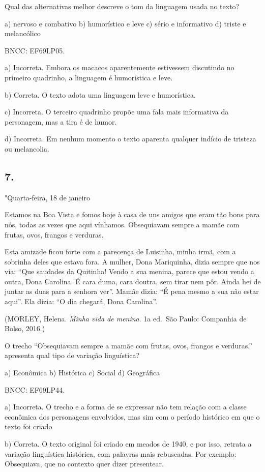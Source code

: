 Qual das alternativas melhor descreve o tom da linguagem usada no texto?

a) nervoso e combativo b) humorístico e leve c) sério e informativo d)
triste e melancólico

BNCC: EF69LP05.

a) Incorreta. Embora os macacos aparentemente estivessem discutindo no
primeiro quadrinho, a linguagem é humorística e leve.

b) Correta. O texto adota uma linguagem leve e humorística.

c) Incorreta. O terceiro quadrinho propõe uma fala mais informativa da
personagem, mas a tira é de humor.

d) Incorreta. Em nenhum momento o texto aparenta qualquer indício de
tristeza ou melancolia.

\hypertarget{section}{%
\subsection{7.}\label{section}}

"Quarta-feira, 18 de janeiro

Estamos na Boa Vista e fomos hoje à casa de uns amigos que eram tão bons
para nós, todas as vezes que aqui vínhamos. Obsequiavam sempre a mamãe
com frutas, ovos, frangos e verduras.

Esta amizade ficou forte com a parecença de Luisinha, minha irmã, com a
sobrinha deles que estava fora. A mulher, Dona Mariquinha, dizia sempre
que nos via: ``Que saudades da Quitinha! Vendo a sua menina, parece que
estou vendo a outra, Dona Carolina. É cara duma, cara doutra, sem tirar
nem pôr. Ainda hei de juntar as duas para a senhora ver''. Mamãe dizia:
``É pena mesmo a sua não estar aqui''. Ela dizia: ``O dia chegará, Dona
Carolina''.

(MORLEY, Helena. \emph{Minha vida de menina}. 1a ed.~São Paulo:
Companhia de Bolso, 2016.)

O trecho ``Obsequiavam sempre a mamãe com frutas, ovos, frangos e
verduras.'' apresenta qual tipo de variação linguística?

a) Econômica b) Histórica c) Social d) Geográfica

BNCC: EF69LP44.

a) Incorreta. O trecho e a forma de se expressar não tem relação com a
classe econômica dos personagens envolvidos, mas sim com o período
histórico em que o texto foi criado

b) Correta. O texto original foi criado em meados de 1940, e por isso,
retrata a variação linguística histórica, com palavras mais rebuscadas.
Por exemplo: Obsequiava, que no contexto quer dizer presentear.

